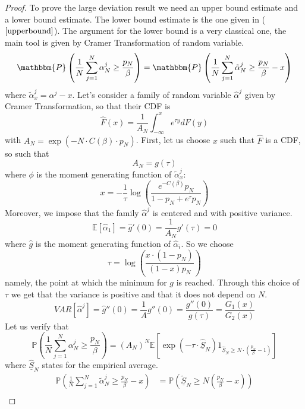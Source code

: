 \begin{proof}
To prove the large deviation result we need an upper bound estimate and a lower bound estimate. The lower bound estimate is the one given in ($\ref{upperbound}$). 
The argument for the lower bound is a very classical one, the main tool is given by Cramer Transformation of random variable. 
\begin{equation*}
\mathbbm{P} \left( \frac{1}{N} \sum_{j = 1}^N \alpha^{j}_N \geq \frac{p_N}{\beta} \right)=\mathbbm{P} \left( \frac{1}{N} \sum_{j = 1}^N \tilde{\alpha}^{j}_N \geq \frac{p_N}{\beta} -x\right)
\end{equation*}
where $\tilde{\alpha}^j_x=\alpha^j-x$. Let's consider a family of random variable $\hat{\alpha}^j$ given by Cramer Transformation, so that their CDF is 
\[\hat{F}(x)=\frac{1}{A_N}\int_{-\infty}^x e^{\tau y} dF(y)\]
with $A_N=\exp(-N\cdot C(\beta)\cdot p_N)$.
First, let us choose $x$ such that $\hat{F}$  is a CDF, so such that
\[  A_N= g(\tau)\]
where $\phi$ is the moment generating function of $\tilde{\alpha}^j_x$:
\[x=-\frac{1}{\tau}\log\left( \frac{e^{-C(\beta)}p_N}{1-p_N+e^\tau p_N}\right)\]
Moreover, we impose that the family $\hat{\alpha}^j$ is centered and with positive variance.
\begin{equation}
\mathbb{E}\left[  \hat{\alpha}_1\right]=\hat{g}'(0)=\frac{1}{A_N} g'(\tau)=0\label{mean}
\end{equation}
where $\hat{g}$ is the moment generating function of $\hat{\alpha}_i$.
So we choose
\[\tau=\log\left(\frac{x\cdot(1-p_N)}{(1-x)p_N}\right)\]
namely, the point at which the minimum for $g$ is reached.
Through this choice of $\tau$ we get that the variance is positive and that it does not depend on $N$.
\begin{equation}
VAR\left[\hat{\alpha}^j\right]=\hat{g}''(0)=\frac{1}{A} g''(0)=\frac{g''(0)}{g(\tau)}=\frac{G_1(x)}{G_2(x)}
\end{equation}\label{variance}
\todo{}
Let us verify that
\begin{equation}
\mathbb{P} \left( \frac{1}{N} \sum_{j = 1}^N \alpha^{j}_N \geq \frac{p_N}{\beta} \right)=(A_N)^N\mathbb{E}\left[\exp(-\tau\cdot \underline{\hat{S}}_N)1_{\underline{\hat{S}}_N\geq N\cdot(\frac{p_N}{\beta}-1)}\right]
\end{equation}
where $\underline{\hat{S}}_N$ states for the empirical average.
\begin{align*}
\mathbb{P} \left( \frac{1}{N} \sum_{j = 1}^N \tilde{\alpha}^{j}_N \geq \frac{p_N}{\beta}-x \right)&=
\mathbb{P} \left(\underline{\tilde{S}}_N \geq N\left(\frac{p_N}{\beta}-x\right) \right)\\

\end{align*}
\end{proof}

